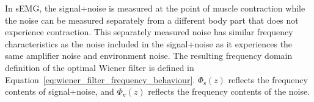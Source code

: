 


In sEMG, the signal+noise is measured at the point of muscle contraction while the noise can be measured separately from a different body part that does not experience contraction. This separately measured noise has similar frequency characteristics as the noise included in the signal+noise as it experiences the same amplifier noise and environment noise. The resulting frequency domain definition of the optimal Wiener filter is defined in Equation~\ref{eq:wiener_filter_frequency_behaviour}\cite{stanford_wiener_filter}. $\Phi_\text{s}(z)$ reflects the frequency contents of signal+noise, and $\Phi_\text{v}(z)$ reflects the frequency contents of the noise.

